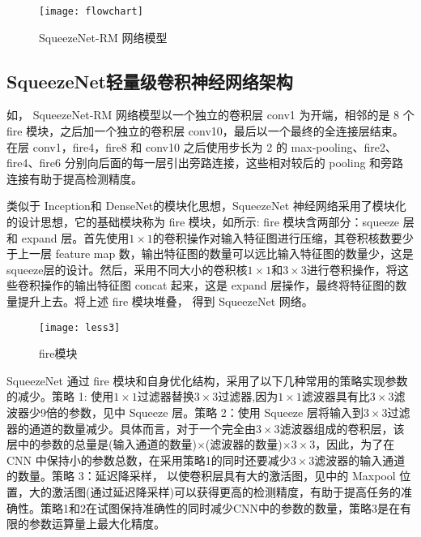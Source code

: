 \documentclass{hitszthesis}
\begin{document}
\begin{figure}[!htbp]
	\centering
	\texttt{[image: flowchart]}
	\caption{SqueezeNet-RM 网络模型}
     \label{figflowchart}
\end{figure}

\subsection{SqueezeNet轻量级卷积神经网络架构}

如， SqueezeNet-RM 网络模型以一个独立的卷积层 conv1 为开端，相邻的是 8 个 f\/ire 模块，之后加一个独立的卷积层 conv10，最后以一个最终的全连接层结束。在层 conv1，f\/ire4，f\/ire8 和 conv10 之后使用步长为 2 的 max-pooling、f\/ire2、f\/ire4、f\/ire6 分别向后面的每一层引出旁路连接，这些相对较后的 pooling 和旁路连接有助于提高检测精度。 

类似于 Inception和 DenseNet的模块化思想，SqueezeNet 神经网络采用了模块化的设计思想，它的基础模块称为 f\/ire 模块，如所示:  f\/ire 模块含两部分：squeeze 层和 expand 层。首先使用$1\times1$的卷积操作对输入特征图进行压缩，其卷积核数要少于上一层 feature map 数，输出特征图的数量可以远比输入特征图的数量少，这是 squeeze层的设计。然后，采用不同大小的卷积核$1\times1$和$3\times3$进行卷积操作，将这些卷积操作的输出特征图 concat 起来，这是 expand 层操作，最终将特征图的数量提升上去。将上述 f\/ire 模块堆叠， 得到 SqueezeNet 网络。

\begin{figure}[!htbp]
	\centering
	\texttt{[image: less3]}
	\caption{f\/ire模块}
     \label{figfire}
\end{figure}

SqueezeNet 通过 f\/ire 模块和自身优化结构，采用了以下几种常用的策略实现参数的减少。策略 1: 使用$1\times1$过滤器替换$3\times3$过滤器,因为$1\times1$滤波器具有比$3\times3$滤波器少9倍的参数，见中 Squeeze 层。策略 2：使用 Squeeze 层将输入到$3\times3$过滤器的通道的数量减少。具体而言，对于一个完全由$3\times3$滤波器组成的卷积层，该层中的参数的总量是(输入通道的数量)$\times$(滤波器的数量)$\times3\times3$，因此，为了在 CNN 中保持小的参数总数，在采用策略1的同时还要减少$3\times3$滤波器的输入通道的数量。策略 3：延迟降采样， 以使卷积层具有大的激活图，见中的 Maxpool 位置，大的激活图(通过延迟降采样)可以获得更高的检测精度，有助于提高任务的准确性。策略1和2在试图保持准确性的同时减少CNN中的参数的数量，策略3是在有限的参数运算量上最大化精度。 
\end{document}
